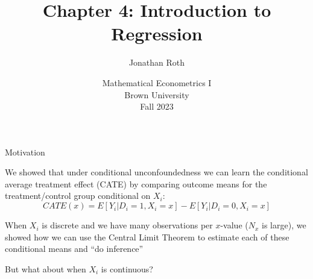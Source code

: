 \documentclass[11pt,english,handout]{beamer}
\newenvironment{wideitemize}{\itemize\addtolength{\itemsep}{10pt}}{\enditemize}
\begin{document}
	
	\begin{frame}[noframenumbering]{}
		\vspace{0.5cm}
		\title[]{Chapter 4: Introduction to Regression}
		\author{Jonathan Roth}
		\date{Mathematical Econometrics I \\ Brown University\\Fall 2023} 
		\titlepage {\small{}\ }\thispagestyle{empty} \vspace{-30pt}
		
	\end{frame}

	
\begin{frame} {Motivation}

\begin{wideitemize}

\item
We showed that under conditional unconfoundedness we can learn the conditional average treatment effect (CATE) by comparing outcome means for the treatment/control group conditional on $X_i$:
$$ CATE(x) = E[ Y_i | D_i = 1 , X_i = x ] - E[Y_i | D_i = 0 ,X_i =x ]$$ 

\item
When $X_i$ is discrete and we have many observations per $x$-value ($N_x$ is large), we showed how we can use the Central Limit Theorem to estimate each of these conditional means and ``do inference'' 

\pause
\item
But what about when $X_i$ is continuous?

\end{wideitemize}
	
\end{frame}	
\end{document}
